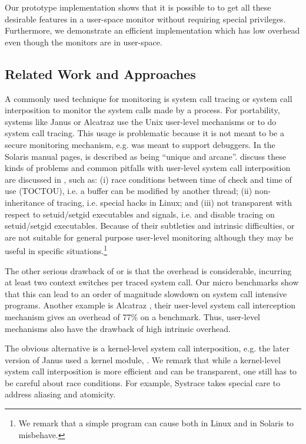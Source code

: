 Our prototype implementation shows that it is possible to to get all
these desirable features in a user-space monitor without requiring special
privileges. Furthermore, we demonstrate an efficient implementation
which has low overhead even though the monitors are in user-space.

\subsection{Related Work and Approaches}

A commonly used technique for monitoring is system call tracing or system call
interposition to monitor the system calls made by a process.
For portability, systems like Janus \cite{janus} or Alcatraz \cite{alcatraz}
use the Unix user-level mechanisms  or  to do
system call tracing.
This usage is problematic because it is not
meant to be a secure monitoring mechanism, e.g.
 was meant to support debuggers.
In the Solaris manual pages,  is described as being
``unique and arcane''.
\cite{garfinkel} discuss 
these kinds of problems and common
pitfalls with user-level system call interposition
are discussed in \cite{garfinkel}, such as:
(i) race conditions between time of check and time of use (TOCTOU), 
i.e. a buffer can be modified by another thread;
(ii) non-inheritance of tracing, i.e. special  hacks in Linux;
and (iii) not transparent with respect to setuid/setgid executables 
and signals,
i.e.  and  disable tracing 
on setuid/setgid executables.  
Because of their subtleties and intrinsic difficulties,
 or  are not suitable for general purpose user-level
monitoring although they may be useful in specific situations.\footnote{
We remark that a simple program can cause both
 in Linux and  in Solaris to misbehave.
}

The other serious drawback of  or  is that
the overhead is considerable, incurring at least two
context switches per traced system call.
Our micro benchmarks show that this can lead to an order of magnitude
slowdown on system call intensive programs.
Another example is Alcatraz \cite{alcatraz},
their user-level system call interception mechanism gives an overhead of 77\%
on a  benchmark.
Thus, user-level mechanisms also have the drawback
of high intrinsic overhead.

The obvious alternative is a kernel-level system call interposition,
e.g. the later version of Janus used a kernel module, 
\cite{garfinkel}.
We remark that while a kernel-level system call interposition
is more efficient and can be transparent, one still has to be
careful about race conditions.
For example, Systrace \cite{systrace} takes special care to address aliasing
and atomicity.

